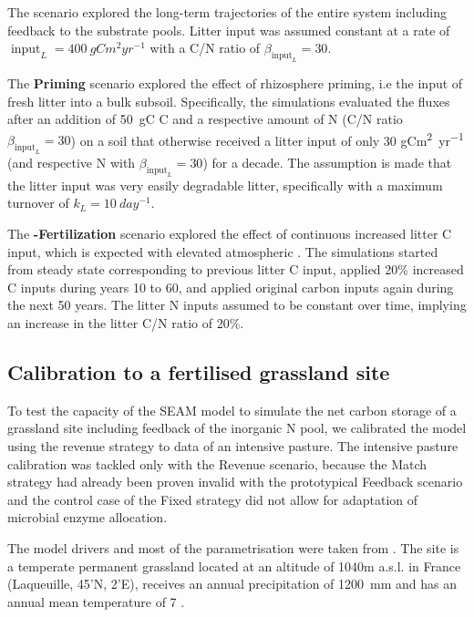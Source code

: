 The 
scenario explored the long-term trajectories of the entire system including
feedback to the substrate pools. Litter input was assumed
constant at a rate of $\operatorname{input}_L = 400~\unit{gCm^2yr^{-1}}$ with a
C/N ratio of $\beta_{\operatorname{input}_L} = 30$.

The \textbf{Priming} scenario explored the effect of rhizosphere priming, i.e
the input of fresh litter into a bulk subsoil. Specifically, the simulations
evaluated the fluxes after an addition of 50~\unit{gC} C and a respective amount
of N (C/N ratio $\beta_{\operatorname{input}_L} = 30$) on a soil that otherwise
received a litter input of only 30 \unit{gCm^2yr^{-1}} (and respective N with
$\beta_{\operatorname{input}_L} = 30$) for a decade. The assumption is made that
the litter input was very easily degradable litter, specifically with a maximum
turnover of $k_L = 10~\unit{day^{-1}}$.

The \textbf{-Fertilization} scenario explored the effect of
continuous increased litter C input, which is expected with elevated atmospheric
.
The simulations started from steady state corresponding to previous litter C
input, applied 20\% increased C inputs during years 10 to 60, and applied original carbon inputs
again during the next 50 years. The litter N inputs assumed to be constant over
time, implying an increase in the litter C/N ratio of 20\%.

\subsection{Calibration to a fertilised grassland site}
\label{sec:methodsPasture}

To test the capacity of the SEAM model to simulate the net carbon storage of a
grassland site including feedback of the inorganic N pool, we calibrated the
model using the revenue strategy to data of an intensive pasture. The intensive
pasture calibration was tackled only with the Revenue scenario, because the
Match strategy had already been proven invalid with the prototypical Feedback
scenario and the control case of the Fixed strategy did not allow for adaptation
of microbial enzyme allocation.

The model drivers and most of the parametrisation were taken
from \citet{Perveen14}. The site is a temperate permanent grassland located at
an altitude of 1040m a.s.l. in France (Laqueuille, 45'N,
2'E), receives an annual precipitation of 1200~mm and has an
annual mean temperature of  7 .

